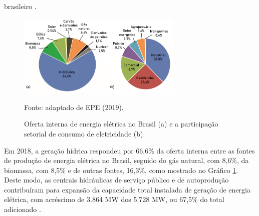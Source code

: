 \begin{onehalfspace}
    brasileiro \cite{EmpresadePesquisaEnergetica-EPE2017,EmpresadePesquisaEnergetica-EPE2017a}.\vspace{-0.6cm} \enlargethispage{0.25\baselineskip}
    \begin{figure}[ht]
        \centering
        \caption{\small Oferta interna de energia elétrica no Brasil (a) e a participação setorial de consumo de eletricidade (b).}
        \includegraphics[width=0.7\textwidth]{graphs/graph1.png}
        \par \small Fonte: adaptado de EPE (2019).
        \label{Grafico 1}
    \end{figure}\pagebreak
    
    \noindent Em 2018, a geração hídrica respondeu por 66,6\% da oferta interna entre as fontes de 
    produção de energia elétrica no Brasil, seguido do gás natural, com 8,6\%, da biomassa, 
    com 8,5\% e de outras fontes, 16,3\%, como mostrado no Gráfico \ref{Grafico 1}. Deste modo, 
    as centrais hidráulicas de serviço público e de autoprodução contribuíram para expansão 
    da capacidade total instalada de geração de energia elétrica, com acréscimo de 3.864 MW 
    dos 5.728 MW, ou 67,5\% do total adicionado \cite{EmpresadePesquisaEnergetica-EPE2019}.\vspace*{0.3cm} \newline


\end{onehalfspace}
